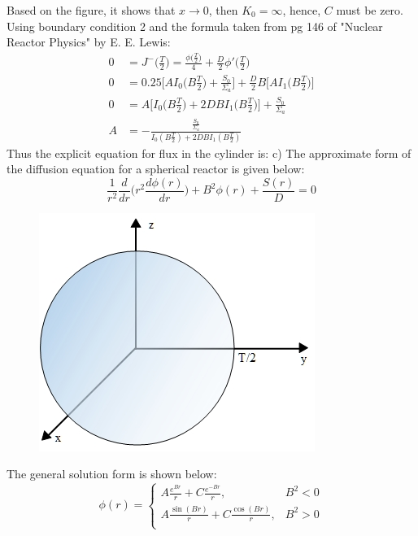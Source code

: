 \documentclass{amsart}
\theoremstyle{definition}
\begin{document}
Based on the figure, it shows that $x\rightarrow 0$, then $K_0 = \infty$, hence, $C$ must be zero.
\bigbreak
Using boundary condition 2 and the formula taken from pg 146 of "Nuclear Reactor Physics" by E. E. Lewis:
\begin{align*}
    0 &= J^-\bigg(\frac{T}{2}\bigg) = \frac{\phi\bigg(\frac{T}{2}\bigg)}{4}+\frac{D}{2}\phi'\bigg(\frac{T}{2}\bigg) \\
    0 &= 0.25\bigg[AI_0\bigg(B\frac{T}{2}\bigg)+\frac{S_0}{\Sigma_a}\bigg]+\frac{D}{2}B\bigg[AI_1\bigg(B\frac{T}{2}\bigg)\bigg] \\
    0 &= A\bigg[I_0\bigg(B\frac{T}{2}\bigg)+2DBI_1\bigg(B\frac{T}{2}\bigg)\bigg]+\frac{S_0}{\Sigma_a} \\
    A &= -\frac{\frac{S_0}{\Sigma_a}}{I_0(B\frac{T}{2})+2DBI_1(B\frac{T}{2})}
\end{align*}
Thus the explicit equation for flux in the cylinder is:
\newpage
\bigbreak
c) The approximate form of the diffusion equation for a spherical reactor is given below:
\bigbreak
\begin{equation*}
    \frac{1}{r^2}\frac{d}{dr}\bigg(r^2 \frac{d\phi(r)}{dr}\bigg) +B^2\phi(r) + \frac{S(r)}{D} = 0
\end{equation*}
\begin{figure}[h!]
                \includegraphics[width=.45\linewidth]{P1c.jpg}
\end{figure}
\bigbreak
The general solution form is shown below:
\bigbreak
\[   \phi(r) = \left\{
\begin{array}{ll}
      A\frac{e^{Br}}{r} + C\frac{e^{-Br}}{r}, &  B^2 < 0\\
      A\frac{\sin(Br)}{r} + C\frac{\cos(Br)}{r}, &  B^2 > 0\\
\end{array}
\right. \]
\end{document}
